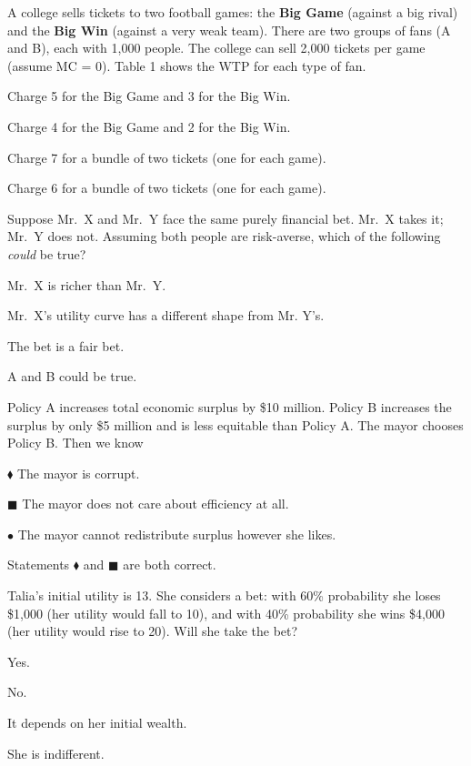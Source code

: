 \documentclass[12pt]{article}
\newcommand{\question}[1]{%
  \Needspace{9\baselineskip}%
  \item #1%
  \vspace{-0.45em}  %
}
\begin{document}
\begin{questions}
  \question{A college sells tickets to two football games: the \textbf{Big Game} (against a big rival) and the \textbf{Big Win} (against a very weak team). There are two groups of fans (A and B), each with 1,000 people. The college can sell 2,000 tickets per game (assume MC = 0). Table 1 shows the WTP for each type of fan.}
  \begin{choices}
    \item Charge 5 for the Big Game and 3 for the Big Win.
    \item Charge 4 for the Big Game and 2 for the Big Win.
    \item Charge 7 for a bundle of two tickets (one for each game).
    \item Charge 6 for a bundle of two tickets (one for each game).
  \end{choices}


  \question{Suppose Mr.\ X and Mr.\ Y face the same purely financial bet. Mr.\ X takes it; Mr.\ Y does not. Assuming both people are risk-averse, which of the following \emph{could} be true?}
  \begin{choices}
    \item Mr.\ X is richer than Mr.\ Y.
    \item Mr.\ X’s utility curve has a different shape from Mr. Y's.
    \item The bet is a fair bet.
    \item A and B could be true.
  \end{choices}


  \question{Policy A increases total economic surplus by \$10 million. Policy B increases the surplus by only \$5 million and is less equitable than Policy A. The mayor chooses Policy B. Then we know}
  \begin{choices}
    \item \(\blacklozenge\) The mayor is corrupt.
    \item \(\blacksquare\) The mayor does not care about efficiency at all.
    \item \(\bullet\) The mayor cannot redistribute surplus however she likes.
    \item Statements \(\blacklozenge\) and \(\blacksquare\) are both correct.
  \end{choices}


  \question{Talia’s initial utility is 13. She considers a bet: with 60\% probability she loses \$1,000 (her utility would fall to 10), and with 40\% probability she wins \$4,000 (her utility would rise to 20). Will she take the bet?}
  \begin{choices}
    \item Yes.
    \item No.
    \item It depends on her initial wealth.
    \item She is indifferent.
  \end{choices}



\end{questions}
\end{document}
